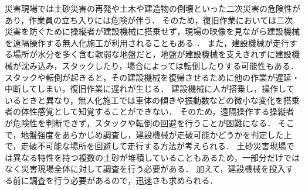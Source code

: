 \documentclass[../main]{subfiles}
\begin{document}
災害現場では土砂災害の再発や土木や建造物の倒壊といった二次災害の危険性があり，作業員の立ち入りには危険が伴う．
そのため，復旧作業においては二次災害を防ぐために操縦者が建設機械に搭乗せず，現場の映像を見ながら建設機械を遠隔操作する無人化施工が利用されることもある ．
また，建設機械が走行する場所が水分を多く含む軟弱な地盤だと，地盤が建設機械を支えきれずに建設機械が沈み込み，スタックしたり，場合によっては転倒したりする可能性もある．
スタックや転倒が起きると，その建設機械を復帰させるために他の作業が遅延・中断してしまい，復旧作業に遅れが生じる．
建設機械に人が搭乗し，操作しているときと異なり，無人化施工では車体の傾きや振動数などの微小な変化を搭乗者の体性感覚として知覚することができない．
そのため，遠隔操作する操縦者が危険性を判断できず，スタックや転倒の回避を行うことが困難になる．
そこで，地盤強度をあらかじめ調査し，建設機械が走破可能かどうかを判定した上で，走破不可能な場所を回避して走行する方法が考えられる．
土砂災害現場では異なる特性を持つ複数の土砂が堆積していることもあるため，一部分だけではなく災害現場全体に対して調査を行う必要がある．
加えて，建設機械を投入する前に調査を行う必要があるので，迅速さも求められる．
\end{document}
